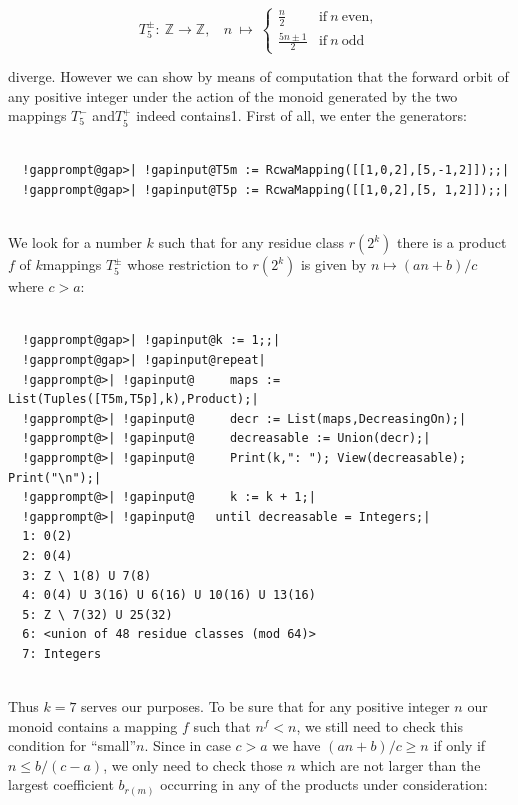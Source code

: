\documentclass[a4paper,11pt]{report}
\begin{document}
{{\[
  T_5^\pm: \ \mathbb{Z} \longrightarrow \mathbb{Z}, \ \ \ \
    n \ \longmapsto \
    \begin{cases}
      \frac{n}{2}        & \text{if} \ n \ \text{even}, \\
      \frac{5n \pm 1}{2} & \text{if} \ n \ \text{odd}
    \end{cases}
  \]

   diverge. However we can show by means of computation that the forward orbit of
any positive integer under the action of the monoid generated by the two
mappings $T_5^-$ and{\nobreakspace}$T_5^+$ indeed contains{\nobreakspace}1. First of all, we enter the generators: 
\begin{Verbatim}[commandchars=!@|,fontsize=\small,frame=single,label=Example]
  
  !gapprompt@gap>| !gapinput@T5m := RcwaMapping([[1,0,2],[5,-1,2]]);;|
  !gapprompt@gap>| !gapinput@T5p := RcwaMapping([[1,0,2],[5, 1,2]]);;|
  
\end{Verbatim}
 We look for a number $k$ such that for any residue class $r(2^k)$ there is a product{\nobreakspace}$f$ of $k${\nobreakspace}mappings $T_5^\pm$ whose restriction to $r(2^k)$ is given by $n \mapsto (an+b)/c$ where $c>a$: 
\begin{Verbatim}[commandchars=!@|,fontsize=\small,frame=single,label=Example]
  
  !gapprompt@gap>| !gapinput@k := 1;;|
  !gapprompt@gap>| !gapinput@repeat|
  !gapprompt@>| !gapinput@     maps := List(Tuples([T5m,T5p],k),Product);|
  !gapprompt@>| !gapinput@     decr := List(maps,DecreasingOn);|
  !gapprompt@>| !gapinput@     decreasable := Union(decr);|
  !gapprompt@>| !gapinput@     Print(k,": "); View(decreasable); Print("\n");|
  !gapprompt@>| !gapinput@     k := k + 1;|
  !gapprompt@>| !gapinput@   until decreasable = Integers;|
  1: 0(2)
  2: 0(4)
  3: Z \ 1(8) U 7(8)
  4: 0(4) U 3(16) U 6(16) U 10(16) U 13(16)
  5: Z \ 7(32) U 25(32)
  6: <union of 48 residue classes (mod 64)>
  7: Integers
  
\end{Verbatim}
 Thus $k=7$ serves our purposes. To be sure that for any positive integer $n$ our monoid contains a mapping $f$ such that $n^f<n$, we still need to check this condition for ``small''{\nobreakspace}$n$. Since in case $c>a$ we have $(an+b)/c \geq n$ if only if $n \leq b/(c-a)$, we only need to check those $n$ which are not larger than the largest coefficient $b_{r(m)}$ occurring in any of the products under consideration: 
\begin{Verbatim}[commandchars=!@|,fontsize=\small,frame=single,label=Example]
  

\end{Verbatim}}}
\end{document}
